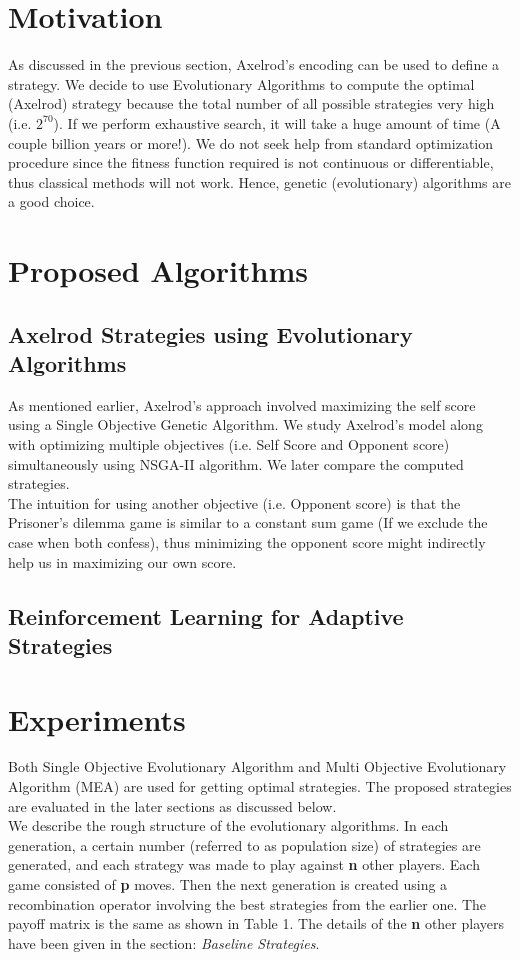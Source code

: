 \documentclass[a4paper]{article}
\begin{document}
	\section{Motivation}
	
	As discussed in the previous section, Axelrod's encoding can be used to define a strategy. We decide to use Evolutionary Algorithms to compute the optimal (Axelrod) strategy because the total number of all possible strategies very high (i.e. $2^{70}$). If we perform exhaustive search, it will take a huge amount of time (A couple billion years or more!). We do not seek help from standard optimization procedure since the fitness function required is not continuous or differentiable, thus classical methods will not work. Hence, genetic (evolutionary) algorithms are a good choice.
	
	\section{Proposed Algorithms}
	
	\subsection{Axelrod Strategies using Evolutionary Algorithms}

	As mentioned earlier, Axelrod's approach involved maximizing the self score using a Single Objective Genetic Algorithm. We study Axelrod's model along with optimizing multiple objectives (i.e. Self Score and Opponent score) simultaneously using NSGA-II algorithm. We later compare the computed strategies.\\
	The intuition for using another objective (i.e. Opponent score) is that the Prisoner's dilemma game is similar to a constant sum game (If we exclude the case when both confess), thus minimizing the opponent score might indirectly help us in maximizing our own score.

	\subsection{Reinforcement Learning for Adaptive Strategies}
	
	\section{Experiments}
	
	Both Single Objective Evolutionary Algorithm and Multi Objective Evolutionary Algorithm (MEA) are used for getting optimal strategies. The proposed strategies are evaluated in the later sections as discussed below.\\
	We describe the rough structure of the evolutionary algorithms. In each generation, a certain number (referred to as population size) of strategies are generated, and each strategy was made to play against \textbf{n} other players. Each game consisted of \textbf{p} moves. Then the next generation is created using a recombination operator involving the best strategies from the earlier one. The payoff matrix is the same as shown in Table 1. The details of the \textbf{n} other players have been given in the section: \textit{Baseline Strategies}.
\end{document}
